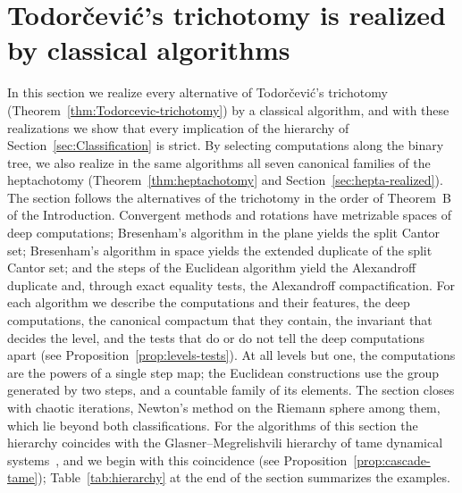 \documentclass[psamsfonts]{amsart}
\theoremstyle{definition}
\theoremstyle{remark}
\numberwithin{equation}{section}
\begin{document}
\section{Todor\v{c}evi\'c's trichotomy is realized by classical algorithms}
\label{sec:iterative}\label{sec:examples}

In this section we realize every alternative of Todor\v{c}evi\'c's trichotomy (Theorem~\ref{thm:Todorcevic-trichotomy}) by a classical algorithm, and with these realizations we show that every implication of the hierarchy of Section~\ref{sec:Classification} is strict.
By selecting computations along the binary tree, we also realize in the same algorithms all seven canonical families of the heptachotomy (Theorem~\ref{thm:heptachotomy} and Section~\ref{sec:hepta-realized}).
The section follows the alternatives of the trichotomy in the order of Theorem~B of the Introduction.
Convergent methods and rotations have metrizable spaces of deep computations; Bresenham's algorithm in the plane yields the split Cantor set; Bresenham's algorithm in space yields the extended duplicate of the split Cantor set; and the steps of the Euclidean algorithm yield the Alexandroff duplicate and, through exact equality tests, the Alexandroff compactification.
For each algorithm we describe the computations and their features, the deep computations, the canonical compactum that they contain, the invariant that decides the level, and the tests that do or do not tell the deep computations apart (see Proposition~\ref{prop:levels-tests}).
At all levels but one, the computations are the powers of a single step map; the Euclidean constructions use the group generated by two steps, and a countable family of its elements.
The section closes with chaotic iterations, Newton's method on the Riemann sphere among them, which lie beyond both classifications.
For the algorithms of this section the hierarchy coincides with the Glasner--Megrelishvili hierarchy of tame dynamical systems~\cite{glasner2022tame}, and we begin with this coincidence (see Proposition~\ref{prop:cascade-tame});
Table~\ref{tab:hierarchy} at the end of the section summarizes the examples.
\end{document}
